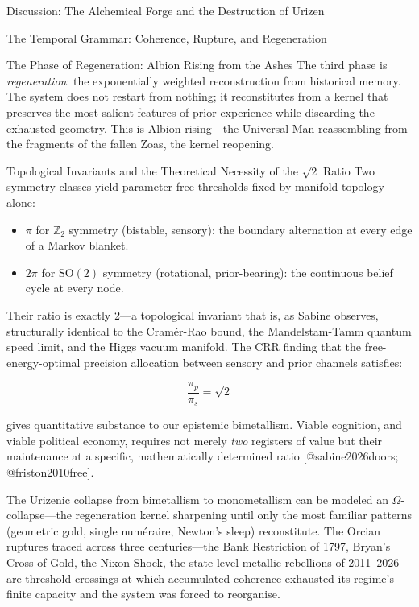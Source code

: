 \documentclass[
  ignorenonframetext,
]{beamer}
\providecommand{\tightlist}{%
  \setlength{\itemsep}{0pt}\setlength{\parskip}{0pt}}
\begin{document}
\begin{frame}{Discussion: The Alchemical Forge and the Destruction of
Urizen}
\begin{block}{The Temporal Grammar: Coherence, Rupture, and
Regeneration}
\begin{block}{The Phase of Regeneration: Albion Rising from the Ashes}
\protect{}\label{the-phase-of-regeneration-albion-rising-from-the-ashes}
The third phase is \emph{regeneration}: the exponentially weighted
reconstruction from historical memory. The system does not restart from
nothing; it reconstitutes from a kernel that preserves the most salient
features of prior experience while discarding the exhausted geometry.
This is Albion rising---the Universal Man reassembling from the
fragments of the fallen Zoas, the kernel reopening.
\end{block}

\begin{block}{Topological Invariants and the Theoretical Necessity of
the \(\sqrt{2}\) Ratio}
\protect{}\label{topological-invariants-and-the-theoretical-necessity-of-the-sqrt2-ratio}
Two symmetry classes yield parameter-free thresholds fixed by manifold
topology alone:

\begin{itemize}
\tightlist
\item
  \(\pi\) for \(\mathbb{Z}_2\) symmetry (bistable, sensory): the
  boundary alternation at every edge of a Markov blanket.
\item
  \(2\pi\) for \(\mathrm{SO}(2)\) symmetry (rotational, prior-bearing):
  the continuous belief cycle at every node.
\end{itemize}

Their ratio is exactly 2---a topological invariant that is, as Sabine
observes, structurally identical to the Cramér-Rao bound, the
Mandelstam-Tamm quantum speed limit, and the Higgs vacuum manifold. The
CRR finding that the free-energy-optimal precision allocation between
sensory and prior channels satisfies:

\[\frac{\pi_p}{\pi_s} = \sqrt{2}\]

gives quantitative substance to our epistemic bimetallism. Viable
cognition, and viable political economy, requires not merely \emph{two}
registers of value but their maintenance at a specific, mathematically
determined ratio {[}@sabine2026doors; @friston2010free{]}.

The Urizenic collapse from bimetallism to monometallism can be modeled
an \(\Omega\)-collapse---the regeneration kernel sharpening until only
the most familiar patterns (geometric gold, single numéraire, Newton's
sleep) reconstitute. The Orcian ruptures traced across three
centuries---the Bank Restriction of 1797, Bryan's Cross of Gold, the
Nixon Shock, the state-level metallic rebellions of 2011--2026---are
threshold-crossings at which accumulated coherence exhausted its
regime's finite capacity and the system was forced to reorganise.


\end{block}
\end{block}
\end{frame}
\end{document}
